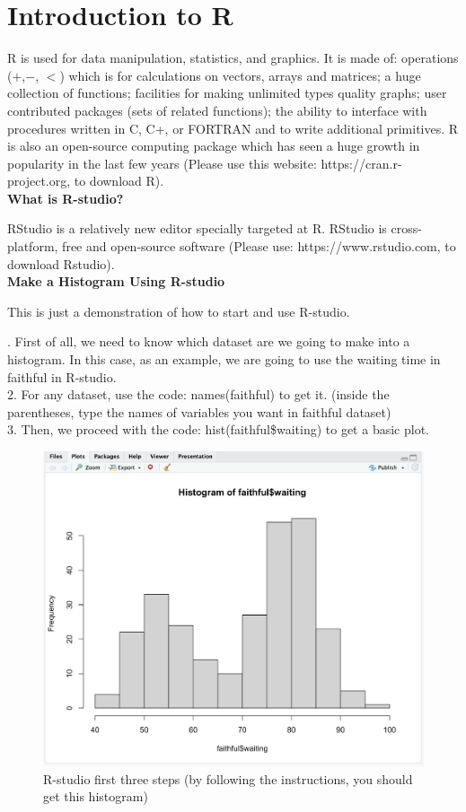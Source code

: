 \section{Introduction to R}

R is used for data manipulation, statistics, and graphics. It is made of: operations ($+$,$ -$, $<$) which is for calculations on vectors, arrays and matrices; a huge collection of functions; facilities for making unlimited types quality graphs; user contributed packages (sets of related functions); the ability to interface with procedures written in C, C+, or FORTRAN and to write additional primitives. R is also an open-source computing package which has seen a huge growth in popularity in the last few years (Please use this website: https://cran.r-project.org, to download R).\\

\noindent
\textbf{What is R-studio?}

\noindent
RStudio is a relatively new editor specially targeted at R. RStudio is cross-platform, free and open-source software (Please use: https://www.rstudio.com, to download Rstudio).\\

\noindent
\textbf{Make a Histogram Using R-studio}

\noindent
This is just a demonstration of how to start and use R-studio. 

. First of all, we need to know which dataset are we going to make into a histogram. In this case, as an example, we are going to use the waiting time in faithful in R-studio.\\
2. For any dataset, use the code: names(faithful) to get it. (inside the parentheses, type the names of variables you want in faithful dataset)\\
3. Then, we proceed with the code: hist(faithful\$waiting) to get a basic plot.\\

\begin{figure}[H]
 \centering
 \includegraphics[scale=0.45]{Section1/img/R1.jpg}
 \caption{R-studio first three steps (by following the instructions, you should get this histogram)}
\end{figure}

